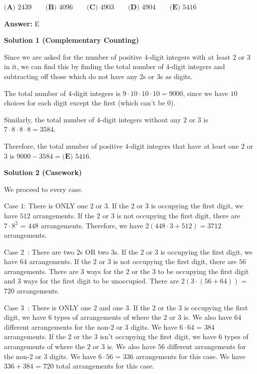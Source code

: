 \begin{enumerate}
 $\textbf{(A) } 2439\qquad\textbf{(B) } 4096\qquad\textbf{(C) } 4903\qquad\textbf{(D) } 4904\qquad\textbf{(E) } 5416$

 \textbf{Answer: }E



\textbf{Solution 1 (Complementary Counting)}

Since we are asked for the number of positive $4$-digit integers with at least $2$ or $3$ in it, we can find this by finding the total number of $4$-digit integers and subtracting off those which do not have any $2$s or $3$s as digits. 

 The total number of $4$-digit integers is $9 \cdot 10 \cdot 10 \cdot 10 = 9000$, since we have $10$ choices for each digit except the first (which can't be $0$).

 Similarly, the total number of $4$-digit integers without any $2$ or $3$ is $7 \cdot 8 \cdot 8 \cdot 8 ={3584}$.

 Therefore, the total number of positive $4$-digit integers that have at least one $2$ or $3$ is $9000-3584=\boxed{\textbf{(E) }5416}.$




\textbf{Solution 2 (Casework)}

We proceed to every case.

 Case $1$: There is ONLY one $2$ or $3$. If the $2$ or $3$ is occupying the first digit, we have $512$ arrangements. If the $2$ or $3$ is not occupying the first digit, there are $7 \cdot 8^2$ = $448$ arrangements. Therefore, we have $2(448 \cdot 3 + 512) = 3712$ arrangements.

 Case $2$ : There are two $2$s OR two $3$s. If the $2$ or $3$ is occupying the first digit, we have $64$ arrangements. If the $2$ or $3$ is not occupying the first digit, there are $56$ arrangements. There are $3$ ways for the $2$ or the $3$ to be occupying the first digit and $3$ ways for the first digit to be unoccupied. There are $2(3 \cdot (56+64))$ = $720$ arrangements.

 Case $3$ : There is ONLY one $2$ and one $3$. If the $2$ or the $3$ is occupying the first digit, we have $6$ types of arrangements of where the $2$ or $3$ is. We also have $64$ different arrangements for the non-$2$ or $3$ digits. We have $6 \cdot 64$ = $384$ arrangements. If the $2$ or the $3$ isn't occupying the first digit, we have $6$ types of arrangements of where the $2$ or $3$ is. We also have $56$ different arrangements for the non-$2$ or $3$ digits. We have $6 \cdot 56$ = $336$ arrangements for this case. We have $336 + 384$ = $720$ total arrangements for this case.


\end{enumerate}
